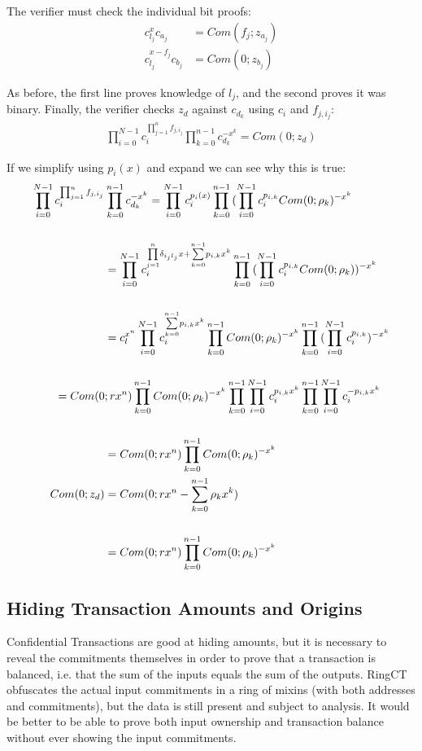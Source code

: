 \documentclass{article}
\newcommand\underoverset[3]{\underset{#1}{\overset{#2}{#3}}}
\begin{document}
The verifier must check the individual bit proofs:
\begin{align}
  c_{l_j}^x c_{a_j} &= Com(f_j; z_{a_j})\\
  c_{l_j}^{x-f_j} c_{b_j} &= Com(0; z_{b_j})
\end{align}
    
As before, the first line proves knowledge of $l_j$, and the second proves it was binary.  Finally, the verifier checks $z_d$ against $c_{d_k}$ using $c_i$ and $f_{j,i_j}$:
\begin{align}
  \prod_{i=0}^{N-1}{c_i^{\prod_{j=1}^{n}{f_{j,i_j}}}} \prod_{k=0}^{n-1}{c_{d_k}^{-x^k}} = Com(0; z_d)
\end{align}

If we simplify using $p_i(x)$ and expand we can see why this is true:
\begin{align}
  \prod_{i=0}^{N-1}{c_i^{\prod_{j=1}^{n}{f_{j,i_j}}}} &  \prod_{k=0}^{n-1}{c_{d_k}^{-x^k}} = \prod_{i=0}^{N-1}{c_i^{p_i(x)}} \prod_{k=0}^{n-1}{(\prod_{i=0}^{N-1}{c_i^{p_{i,k}}} Com(0; \rho_k)^{-x^k}}\\
  \cr &= \prod_{i=0}^{N-1}{c_i^{  \underoverset{j=1}{n}{\prod}{\delta_{i_jl_j} x} + \underoverset{k=0}{n-1}{\sum}{p_{i,k} x^k}   }} \prod_{k=0}^{n-1}{(\prod_{i=0}^{N-1}{c_i^{p_{i,k}}} Com(0; \rho_k))^{-x^k}}\\
  \cr &= c_l^{x^n} \prod_{i=0}^{N-1}{c_i^{ \underoverset{k=0}{n-1}{\sum}{p_{i,k} x^k} }}        \prod_{k=0}^{n-1}{ Com(0; \rho_k)^{-x^k}}         \prod_{k=0}^{n-1}{(\prod_{i=0}^{N-1}{c_i^{p_{i,k}}})^{-x^k}}\\
  \cr = Com(0 &; r x^n) \prod_{k=0}^{n-1}{ Com(0; \rho_k)^{-x^k}}      \prod_{k=0}^{n-1}{\prod_{i=0}^{N-1}{c_i^{p_{i,k}  x^k}}}          \prod_{k=0}^{n-1}{\prod_{i=0}^{N-1}{c_i^{-p_{i,k} x^k}}}\\
  \cr &= Com(0; r x^n) \prod_{k=0}^{n-1}{ Com(0; \rho_k)^{-x^k}}\\
  Com(0; z_d) &= Com(0; rx^n - \sum_{k=0}^{n-1}{\rho_k x^k})\\
  \cr &= Com(0; rx^n) \prod_{k=0}^{n-1}{Com(0; \rho_k)^{-x^k}}
\end{align}


\subsection{Hiding Transaction Amounts and Origins}
 
Confidential Transactions are good at hiding amounts, but it is necessary to reveal the commitments themselves in order to prove that a transaction is balanced, i.e. that the sum of the inputs equals the sum of the outputs.  RingCT obfuscates the actual input commitments in a ring of mixins (with both addresses and commitments), but the data is still present and subject to analysis.  It would be better to be able to prove both input ownership and transaction balance without ever showing the input commitments.
\end{document}
